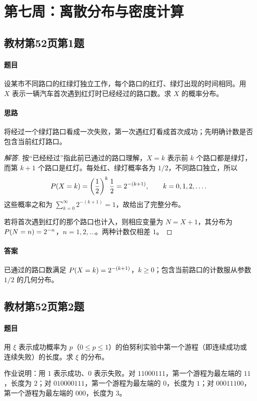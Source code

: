 \section{第七周：离散分布与密度计算}

\subsection{教材第52页第1题}\label{ex:w07-b52-1}
\paragraph{题目}
设某市不同路口的红绿灯独立工作，每个路口的红灯、绿灯出现的时间相同。用 $X$ 表示一辆汽车首次遇到红灯时已经经过的路口数。求 $X$ 的概率分布。
\paragraph{思路} 将经过一个绿灯路口看成一次失败，第一次遇红灯看成首次成功；先明确计数是否包含当前红灯路口。
\begin{proof}[解答]
按“已经经过”指此前已通过的路口理解，$X=k$ 表示前 $k$ 个路口都是绿灯，而第 $k+1$ 个路口是红灯。每处红、绿灯概率各为 $1/2$，不同路口独立，所以
\[
\P(X=k)=\left(\frac12\right)^k\frac12=2^{-(k+1)},\qquad k=0,1,2,\ldots.
\]
这些概率之和为 $\sum_{k=0}^{\infty}2^{-(k+1)}=1$，故给出了完整分布。

若将首次遇到红灯的那个路口也计入，则相应变量为 $N=X+1$，其分布为 $\P(N=n)=2^{-n}$，$n=1,2,\ldots$。两种计数仅相差 $1$。
\end{proof}
\paragraph{答案} 已通过的路口数满足 $\P(X=k)=2^{-(k+1)}$，$k\geq0$；包含当前路口的计数服从参数 $1/2$ 的几何分布。

\subsection{教材第52页第2题}\label{ex:w07-b52-2}
\paragraph{题目}
用 $\xi$ 表示成功概率为 $p$（$0\leq p\leq1$）的伯努利实验中第一个游程（即连续成功或连续失败）的长度。求 $\xi$ 的分布。

作业说明：用 $1$ 表示成功、$0$ 表示失败。对 $11000111$，第一个游程为最左端的 $11$，长度为 $2$；对 $010000111$，第一个游程为最左端的 $0$，长度为 $1$；对 $00011100$，第一个游程为最左端的 $000$，长度为 $3$。
